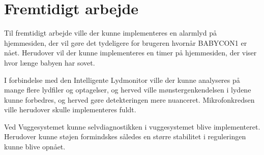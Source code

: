 \chapter{Fremtidigt arbejde}
\label{fremtidigtArbejde}

Til fremtidigt arbejde ville der kunne implementeres en alarmlyd på hjemmesiden, der vil gøre det tydeligere for brugeren hvornår BABYCON1 er nået. Herudover vil der kunne implementeres en timer på hjemmesiden, der viser hvor længe babyen har sovet. 

I forbindelse med den Intelligente Lydmonitor ville der kunne analyseres på mange flere lydfiler og optagelser, og herved ville mønstergenkendelsen i lydene kunne forbedres, og herved gøre detekteringen mere nuanceret. Mikrofonkredsen ville herudover skulle implementeres fuldt. 

Ved Vuggesystemet kunne selvdiagnostikken i vuggesystemet blive implementeret. Herudover kunne støjen formindskes således en større stabilitet i reguleringen kunne blive opnået. 

